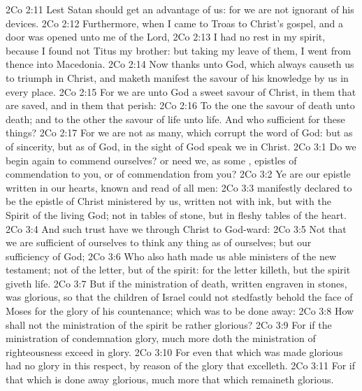 \vs 2Co 2:11 Lest Satan should get an advantage of us: for we are not ignorant of his devices.
\vs 2Co 2:12 Furthermore, when I came to Troas to  Christ's gospel, and a door was opened unto me of the Lord,
\vs 2Co 2:13 I had no rest in my spirit, because I found not Titus my brother: but taking my leave of them, I went from thence into Macedonia.
\vs 2Co 2:14 Now thanks  unto God, which always causeth us to triumph in Christ, and maketh manifest the savour of his knowledge by us in every place.
\vs 2Co 2:15 For we are unto God a sweet savour of Christ, in them that are saved, and in them that perish:
\vs 2Co 2:16 To the one  the savour of death unto death; and to the other the savour of life unto life. And who  sufficient for these things?
\vs 2Co 2:17 For we are not as many, which corrupt the word of God: but as of sincerity, but as of God, in the sight of God speak we in Christ.
\vs 2Co 3:1 Do we begin again to commend ourselves? or need we, as some , epistles of commendation to you, or  of commendation from you?
\vs 2Co 3:2 Ye are our epistle written in our hearts, known and read of all men:
\vs 2Co 3:3  manifestly declared to be the epistle of Christ ministered by us, written not with ink, but with the Spirit of the living God; not in tables of stone, but in fleshy tables of the heart.
\vs 2Co 3:4 And such trust have we through Christ to God-ward:
\vs 2Co 3:5 Not that we are sufficient of ourselves to think any thing as of ourselves; but our sufficiency  of God;
\vs 2Co 3:6 Who also hath made us able ministers of the new testament; not of the letter, but of the spirit: for the letter killeth, but the spirit giveth life.
\vs 2Co 3:7 But if the ministration of death, written  engraven in stones, was glorious, so that the children of Israel could not stedfastly behold the face of Moses for the glory of his countenance; which  was to be done away:
\vs 2Co 3:8 How shall not the ministration of the spirit be rather glorious?
\vs 2Co 3:9 For if the ministration of condemnation  glory, much more doth the ministration of righteousness exceed in glory.
\vs 2Co 3:10 For even that which was made glorious had no glory in this respect, by reason of the glory that excelleth.
\vs 2Co 3:11 For if that which is done away  glorious, much more that which remaineth  glorious.
